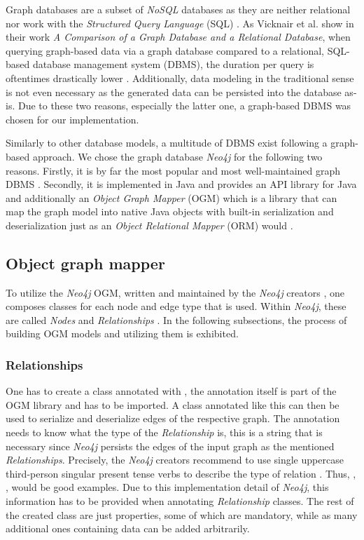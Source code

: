 \documentclass[12pt,a4paper]{report}
\begin{document}
Graph databases are a subset of \textit{NoSQL} databases as they are
neither relational nor work with the \textit{Structured Query Language} (SQL)
\cite{vicknair2010graphdatabase}.
As Vicknair et al. show in their work \textit{A Comparison of a
Graph Database and a Relational Database}, when querying graph-based
data via a graph database compared to a relational, SQL-based
database management system (DBMS), the duration per query is oftentimes
drastically lower \cite{vicknair2010graphdatabase}.
Additionally, data modeling in the traditional sense is not even
necessary as the generated data can be persisted into the database as-is.
Due to these two reasons, especially the latter one, a graph-based DBMS
was chosen for our implementation.

Similarly to other database models, a multitude of DBMS exist following a
graph-based approach.
We chose the graph database \textit{Neo4j} for the following two reasons.
Firstly, it is by far the most popular and most well-maintained graph DBMS
\cite{graph-dbms-ranking}.
Secondly, it is implemented in Java and provides an API library for Java
and additionally an \textit{Object Graph Mapper} (OGM) which is a library
that can map the graph model into native Java objects with built-in
serialization and deserialization just as an \textit{Object Relational Mapper} (ORM)
would \cite{neo4j-ogm}.


\subsection{Object graph mapper}

To utilize the \textit{Neo4j} OGM, written and maintained by the \textit{Neo4j}
creators \cite{neo4j-ogm}, one composes classes for each node and edge type
that is used. Within \textit{Neo4j}, these are called \textit{Nodes} and
\textit{Relationships} \cite{neo4j-ogm}.
In the following subsections, the process of building OGM models and utilizing
them is exhibited.


\subsubsection{Relationships}
One has to create a class annotated with ,
the annotation itself is part of the OGM library and has to be imported.
A class annotated like this can then be used to serialize and deserialize edges
of the respective graph. The annotation needs to know what the type of the
\textit{Relationship} is, this is a string that is necessary since \textit{Neo4j}
persists the edges of the input graph as the mentioned \textit{Relationships}.
Precisely, the \textit{Neo4j} creators recommend to use single uppercase third-person
singular present tense verbs to describe the type of relation \cite{neo4j-ogm}.
Thus, , ,  would
be good examples. Due to this implementation detail of \textit{Neo4j},
this information has to be provided when annotating \textit{Relationship} classes.
The rest of the created class are just properties, some of which are mandatory,
while as many additional ones containing data can be added arbitrarily.
\end{document}
